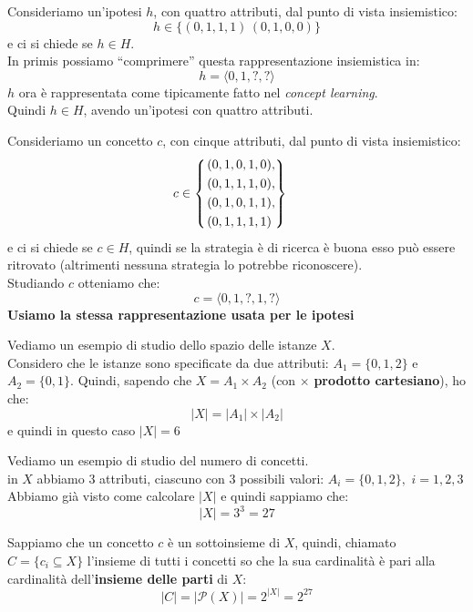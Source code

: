 \documentclass[a4paper,12pt, oneside]{book}
\begin{document}
\begin{esempio}
  Consideriamo un'ipotesi $h$, con quattro attributi, dal punto di vista
  insiemistico: 
  \[h\in\{( 0, 1, 1, 1)\,(0, 1, 0, 0)\}\]
  e ci si chiede se $h\in H$.\\
  In primis possiamo ``comprimere'' questa rappresentazione insiemistica in:
  \[h=\langle 0, 1, ?, ?\rangle\]
  $h$ ora è rappresentata come tipicamente fatto nel \textit{concept
    learning}.\\
  Quindi $h\in H$, avendo un'ipotesi con quattro attributi. 
\end{esempio}
\begin{esempio}
  Consideriamo un concetto $c$, con cinque attributi, dal punto di vista
  insiemistico:
  \[c\in
    \begin{cases}
      \begin{rcases}
        (0,1,0,1,0),\\
        (0,1,1,1,0),\\
        (0,1,0,1,1),\\
        (0,1,1,1,1)
      \end{rcases}
    \end{cases}
  \]
  e ci si chiede se $c\in H$, quindi se la strategia è di ricerca è buona esso
  può essere ritrovato (altrimenti nessuna strategia lo potrebbe riconoscere).\\
  Studiando $c$ otteniamo che:
  \[c=\langle 0,1,?,1,?\rangle\]
  \textbf{Usiamo la stessa rappresentazione usata per le ipotesi}
\end{esempio}
\begin{esempio}
  Vediamo un esempio di studio dello spazio delle istanze $X$.\\
  Considero che le istanze sono specificate da due attributi: $A_1=\{0,1,2\}$ e
  $A_2=\{0,1\}$.
  Quindi, sapendo che $X=A_1\times A_2$ (con $\times$ \textbf{prodotto
    cartesiano}), ho che: 
  \[|X|=|A_1|\times |A_2|\]
  e quindi in questo caso $|X|=6$
\end{esempio}
\begin{esempio}
  Vediamo un esempio di studio del numero di concetti.\\
  in $X$ abbiamo 3 attributi, ciascuno con 3 possibili valori:
  $A_i=\{0,1,2\},\,\,i= 1,2,3$
  Abbiamo già visto come calcolare $|X|$ e quindi sappiamo che:
  \[|X|=3^3=27\]
  
  Sappiamo che un concetto $c$ è un sottoinsieme di $X$, quindi, chiamato
  $C=\{c_i\subseteq X\}$ l'insieme di tutti i concetti so che la sua cardinalità
  è pari alla cardinalità dell'\textbf{insieme delle parti} di $X$:
  \[|C|=|\mathcal{P}(X)|=2^{|X|}=2^{27}\]
\end{esempio}
\end{document}
